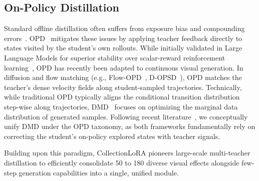 \subsection{On-Policy Distillation}
Standard offline distillation often suffers from exposure bias and compounding errors~\cite{llmopd}. OPD~\cite{llmopd,minillm,rethinkingopd} mitigates these issues by applying teacher feedback directly to states visited by the student’s own rollouts. While initially validated in Large Language Models for superior stability over scalar-reward reinforcement learning~\cite{rlopd}, OPD has recently been adapted to continuous visual generation. In diffusion and flow matching (e.g., Flow-OPD~\cite{fang2026flowopdonpolicydistillationflow}, D-OPSD~\cite{jiang2026dopsdonpolicyselfdistillationcontinuously}), OPD matches the teacher’s dense velocity fields along student-sampled trajectories.
Technically, while traditional OPD typically aligns the conditional transition distribution step-wise along trajectories, DMD~\cite{dmd2} focuses on optimizing the marginal data distribution of generated samples. Following recent literature~\cite{gu2026anyflowanystepvideodiffusion,chern2025livetalkrealtimemultimodalinteractive}, we conceptually unify DMD under the OPD taxonomy, as both frameworks fundamentally rely on correcting the student's on-policy explored states with teacher signals.

Building upon this paradigm, CollectionLoRA pioneers large-scale multi-teacher distillation to efficiently consolidate 50 to 180 diverse visual effects alongside few-step generation capabilities into a single, unified module.
